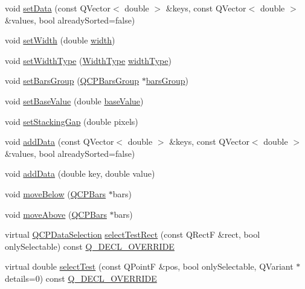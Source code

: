 \begin{DoxyCompactItemize}
void \hyperlink{class_q_c_p_bars_a2a88cd5b16ec7b71e5a590f95b50c5ce}{set\+Data} (const Q\+Vector$<$ double $>$ \&keys, const Q\+Vector$<$ double $>$ \&values, bool already\+Sorted=false)
\item 
void \hyperlink{class_q_c_p_bars_afec6116579d44d5b706e0fa5e5332507}{set\+Width} (double \hyperlink{class_q_c_p_bars_abe7eb3987d8711f45829db879aee2280}{width})
\item 
void \hyperlink{class_q_c_p_bars_adcaa3b41281bb2c0f7949b341592fcc0}{set\+Width\+Type} (\hyperlink{class_q_c_p_bars_a65dbbf1ab41cbe993d71521096ed4649}{Width\+Type} \hyperlink{class_q_c_p_bars_a4c103fb405a45f47853e0345f0c6e708}{width\+Type})
\item 
void \hyperlink{class_q_c_p_bars_aedd1709061f0b307c47ddb45e172ef9a}{set\+Bars\+Group} (\hyperlink{class_q_c_p_bars_group}{Q\+C\+P\+Bars\+Group} $\ast$\hyperlink{class_q_c_p_bars_a5eef59840b68d205df4e0c3df5f97633}{bars\+Group})
\item 
void \hyperlink{class_q_c_p_bars_a574ec7eb7537566df1a28ff085d75623}{set\+Base\+Value} (double \hyperlink{class_q_c_p_bars_a29a7b3b86f80b2a04bd1f9ec0ebaf422}{base\+Value})
\item 
void \hyperlink{class_q_c_p_bars_aeacf7561afb1c70284b22822b57c7bb5}{set\+Stacking\+Gap} (double pixels)
\item 
void \hyperlink{class_q_c_p_bars_a323d6970d6d6e3166d89916a7f60f733}{add\+Data} (const Q\+Vector$<$ double $>$ \&keys, const Q\+Vector$<$ double $>$ \&values, bool already\+Sorted=false)
\item 
void \hyperlink{class_q_c_p_bars_a684dd105403a5497fda42f2094fecbb7}{add\+Data} (double key, double value)
\item 
void \hyperlink{class_q_c_p_bars_a69fc371346980f19177c3d1ecdad78ee}{move\+Below} (\hyperlink{class_q_c_p_bars}{Q\+C\+P\+Bars} $\ast$bars)
\item 
void \hyperlink{class_q_c_p_bars_ac22e00a6a41509538c21b04f0a57318c}{move\+Above} (\hyperlink{class_q_c_p_bars}{Q\+C\+P\+Bars} $\ast$bars)
\item 
virtual \hyperlink{class_q_c_p_data_selection}{Q\+C\+P\+Data\+Selection} \hyperlink{class_q_c_p_bars_ab03bb6125c3e983b89d694f75ce6b3d5}{select\+Test\+Rect} (const Q\+RectF \&rect, bool only\+Selectable) const \hyperlink{qcustomplot_8h_a42cc5eaeb25b85f8b52d2a4b94c56f55}{Q\+\_\+\+D\+E\+C\+L\+\_\+\+O\+V\+E\+R\+R\+I\+DE}
\item 
virtual double \hyperlink{class_q_c_p_bars_a121f899c27af3186fe93dcd0eb98f49b}{select\+Test} (const Q\+PointF \&pos, bool only\+Selectable, Q\+Variant $\ast$details=0) const \hyperlink{qcustomplot_8h_a42cc5eaeb25b85f8b52d2a4b94c56f55}{Q\+\_\+\+D\+E\+C\+L\+\_\+\+O\+V\+E\+R\+R\+I\+DE}

\end{DoxyCompactItemize}
